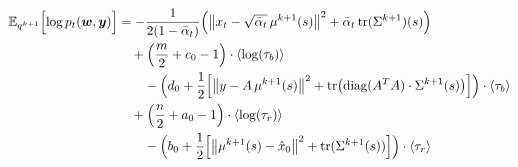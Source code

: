 \documentclass[12pt]{article}
\newcommand{\w}{\boldsymbol{w}}
\newcommand{\y}{\boldsymbol{y}}
\newcommand{\alt}{\bar\alpha_t}
\begin{document}
\begin{propositionbox}
\begin{equation}
\begin{aligned}
\mathbb{E}_{q^{k+1}}\Bigl[ \log p_t(\w,\y) \Bigr]
&= -\frac{1}{2(1 - \alt)} \Bigl(
\left\| x_t - \sqrt{\alt}\, \mu^{k+1}(s) \right\|^2 + \alt\, \mathrm{tr}(\Sigma^{k+1})(s)
  \Bigr)\\
  &\quad+ \Bigl(\frac{m}{2} + c_0 -1\Bigr) \cdot \langle\log(\tau_b)\rangle \\
  &\qquad- \Bigl( d_0 + \frac12\Bigl[ \left\| y - A\, \mu^{k+1}(s) \right\|^2 + \mathrm{tr}\bigl(\mathrm{diag}(A^TA)\cdot \Sigma^{k+1}(s) \bigr) \Bigr] \Bigr)\cdot \langle\tau_b\rangle\\
  &\quad+ \Bigl(\frac{n}{2} + a_0 -1\Bigr)\cdot  \langle\log(\tau_r)\rangle \\
  &\qquad- \Bigl( b_0 + \frac12\Bigl[ \left\| \mu^{k+1}(s) - \hat{x}_0 \right\|^2 + \mathrm{tr}(\Sigma^{k+1}(s)) \Bigr] \Bigr)\cdot \langle\tau_r\rangle
\end{aligned}
\end{equation}
\end{propositionbox}
\end{document}
